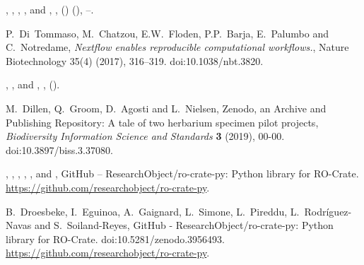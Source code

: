 \documentclass[ds,v1.1.2,openaccess]{iosart2x}%
\begin{document}
\begin{thebibliography}{}
%
\begin{barticle}
,
,
,
,
 and
,
,
()
(),
--.
\end{barticle}
%
\OrigBibText
P.~Di~Tommaso,
M.~Chatzou,
E.W.~Floden,
P.P.~Barja,
E.~Palumbo and
C.~Notredame,
\textit{Nextflow enables reproducible computational workflows.},
Nature Biotechnology
35(4)
(2017),
316--319.
doi:10.1038/nbt.3820.
\endOrigBibText
{}
\endbibitem

%
\begin{barticle}
,
,
 and
,
,
().
\end{barticle}
%
\OrigBibText
M.~Dillen,
Q.~Groom,
D.~Agosti and
L.~Nielsen,
Zenodo, an Archive and Publishing Repository: A tale of two herbarium specimen
pilot projects,
\textit{Biodiversity Information Science and Standards}
\textbf{3}
(2019), 00-00.
doi:10.3897/biss.3.37080.
\endOrigBibText
{}
\endbibitem

%
\begin{botherref}
,
,
,
,
,
 and
,
{GitHub} -- {ResearchObject}/ro-crate-py: Python library for {RO}-Crate.
\url{https://github.com/researchobject/ro-crate-py}.
\end{botherref}
%
\OrigBibText
B.~Droesbeke,
I.~Eguinoa,
A.~Gaignard,
L.~Simone,
L.~Pireddu,
L.~Rodr\'iguez-Navas and
S.~Soiland-Reyes,
{GitHub} - {ResearchObject}/ro-crate-py: Python library for {RO}-Crate.
doi:10.5281/zenodo.3956493.
\url{https://github.com/researchobject/ro-crate-py}.
\endOrigBibText
{}
\endbibitem


\end{thebibliography}
\end{document}
